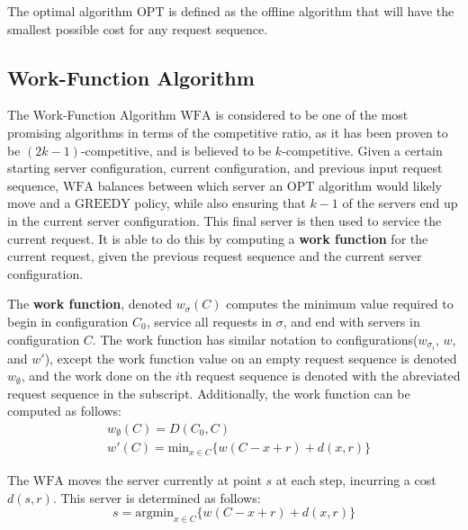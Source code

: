 \begin{definition}
    The optimal algorithm $\mathrm{OPT}$ is defined as the offline algorithm that will have the smallest possible cost for any request sequence.
\end{definition}

\subsection{Work-Function Algorithm}
\label{sec:WFA}
The Work-Function Algorithm $\mathrm{WFA}$ is considered to be one of the most promising algorithms in terms of the competitive ratio, as it has been proven to be $(2k-1)$-competitive, and is believed to be $k$-competitive. Given a certain starting server configuration, current configuration, and previous input request sequence, $\mathrm{WFA}$ balances between which server an $\mathrm{OPT}$ algorithm would likely move and a $\mathrm{GREEDY}$ policy, while also ensuring that $k-1$ of the servers end up in the current server configuration. This final server is then used to service the current request. It is able to do this by computing a \textbf{work function} for the current request, given the previous request sequence and the current server configuration.

\begin{definition}
    The \textbf{work function}, denoted $w_\sigma(C)$ computes the minimum value required to begin in configuration $C_0$, service all requests in $\sigma$, and end with servers in configuration $C$. The work function has similar notation to configurations($w_{\sigma_i}$, $w$, and $w'$), except the work function value on an empty request sequence is denoted $w_\emptyset$, and the work done on the $i$th request sequence is denoted with the abreviated request sequence in the subscript. Additionally, the work function can be computed as follows:
    \begin{equation*}
        \begin{split}
            &w_\emptyset(C) = D(C_0, C) \\
            &w'(C) = \mathrm{min}_{x \in C} \{ w(C - x + r) + d(x, r)\}
        \end{split}
    \end{equation*}
\end{definition}

\begin{definition}
    The $\mathrm{WFA}$ moves the server currently at point $s$ at each step, incurring a cost $d(s,r)$. This server is determined as follows:
    \begin{equation*}
        s = \mathrm{argmin}_{x \in C} \{ w(C-x+r) + d(x,r)\}
    \end{equation*}
\end{definition}

